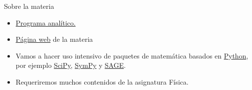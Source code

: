 \documentclass[handout,hyperref={colorlinks=true}]{beamer}
\begin{document}
\begin{frame}{Sobre la materia}

\begin{itemize}
 \item  \href{https://docs.google.com/viewer?a=v&pid=sites&srcid=ZGVmYXVsdGRvbWFpbnxlY3VhY2lvbmVzZGlmZXJlbmNpYWxldW5yY3xneDoyZjE0YzJmMDcyODc0ZGQ3}{Programa analítico.}
 \item  \href{https://sites.google.com/site/ecuacionesdiferencialeunrc/ecuaciones-diferenciales-unrc}{Página web} de la materia
 \item  Vamos a hacer uso intensivo de paquetes de matemática basados en \href{https://www.python.org/}{Python}, por ejemplo \href{http://www.scipy.org/}{SciPy},  \href{http://www.scipy.org/}{SymPy} y \href{http://www.sagemath.org/}{SAGE}.
 \item  Requeriremos muchos contenidos de la asignatura Física.

\end{itemize}
\end{frame}
\end{document}

